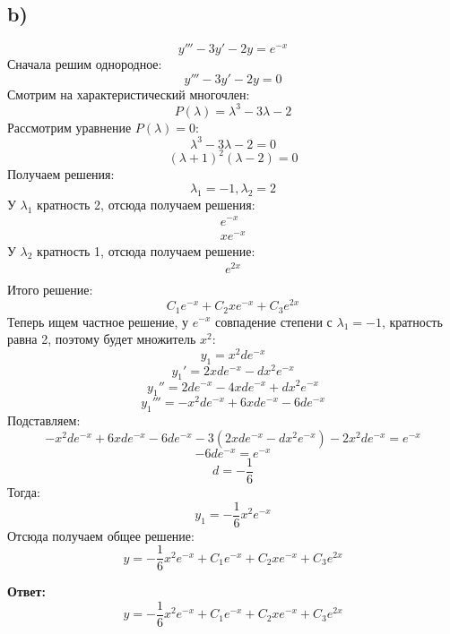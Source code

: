 \documentclass[a4paper, 12pt]{article}
\begin{document}
\subsection*{b)}
\[
y''' - 3y' -2y = e^{-x}
\]
Сначала решим однородное:
\[
y''' - 3y' -2y= 0
\]
Смотрим на характеристический многочлен:
\[
P(\lambda) = \lambda^3 - 3 \lambda -2 
\]
Рассмотрим уравнение $P(\lambda) = 0$:
\[
\lambda^3 - 3 \lambda -2 = 0
\]
\[
(\lambda + 1)^2 (\lambda -2) = 0
\]
Получаем решения:
\[
\lambda_1 = -1, \lambda_2 = 2
\]
У $\lambda_1$ кратность 2, отсюда получаем решения:
\[
      \begin{gathered} 
e^{-x}  \\
x e^{-x}
      \end{gathered} 
\]
У $\lambda_2$ кратность 1, отсюда получаем решение:
\[
      \begin{gathered} 
e^{2x} \\
      \end{gathered} 
\]
Итого решение:
\[
C_1e^{-x} + C_2 xe^{-x} + C_3e^{2x}
\]
Теперь ищем частное решение, у $e^{-x}$ совпадение степени с $\lambda_1 = -1$, кратность равна 2, поэтому будет множитель $x^2$:
\[
y_1 = x^2 d e^{-x}
\]
\[
y_1' = 2x d e^{-x}  - d x^2 e^{-x} 
\]
\[
y_1'' = 2 d e^{-x} - 4 xd e^{-x}  + d x^2e^{-x} 
\]
\[
y_1''' = -x^2 d e^{-x} +6x d e^{-x} -6 d e^{-x}
\]
Подставляем:
\[
-x^2 d e^{-x} +6x d e^{-x} -6 d e^{-x} - 3(2x d e^{-x}  - d x^2 e^{-x} ) - 2x^2 de^{-x} = e^{-x}
\]
\[
-6de^{-x} = e^{-x}
\]
\[
d = -\frac{1}{6}
\]
Тогда:
\[
y_1 = - \frac{1}{6}x^2e^{-x}
\]
Отсюда получаем общее решение:
\[
 y = - \frac{1}{6}x^2e^{-x} + C_1e^{-x} + C_2 xe^{-x} + C_3e^{2x}
\]
\begin{center}
\textbf{Ответ: } 
\[
 y = - \frac{1}{6}x^2e^{-x} + C_1e^{-x} + C_2 xe^{-x} + C_3e^{2x}
\]
\end{center}
\clearpage
\end{document}
